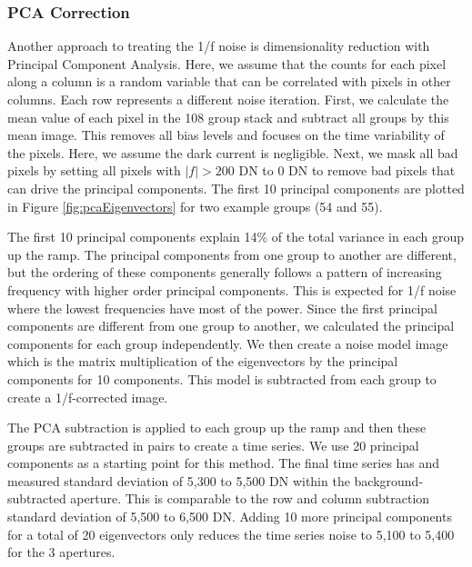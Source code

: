 \documentclass{aastex62}
\begin{document}
\subsubsection{PCA Correction}
Another approach to treating the 1/f noise is dimensionality reduction with Principal Component Analysis.
Here, we assume that the counts for each pixel along a column is a random variable that can be correlated with pixels in other columns.
Each row represents a different noise iteration.
First, we calculate the mean value of each pixel in the 108 group stack and subtract all groups by this mean image.
This removes all bias levels and focuses on the time variability of the pixels.
Here, we assume the dark current is negligible.
Next, we mask all bad pixels by setting all pixels with $| f | > 200$ DN to 0 DN to remove bad pixels that can drive the principal components.
The first 10 principal components are plotted in Figure \ref{fig:pcaEigenvectors} for two example groups (54 and 55).

The first 10 principal components explain 14\% of the total variance in each group up the ramp.
The principal components from one group to another are different, but the ordering of these components generally follows a pattern of increasing frequency with higher order principal components.
This is expected for 1/f noise where the lowest frequencies have most of the power.
Since the first principal components are different from one group to another, we calculated the principal components for each group independently.
We then create a noise model image which is the matrix multiplication of the eigenvectors by the principal components for 10 components.
This model is subtracted from each group to create a 1/f-corrected image.

The PCA subtraction is applied to each group up the ramp and then these groups are subtracted in pairs to create a time series.
We use 20 principal components as a starting point for this method.
The final time series has and measured standard deviation of 5,300 to 5,500 DN within the background-subtracted aperture.
This is comparable to the row and column subtraction standard deviation of 5,500 to 6,500 DN.
Adding 10 more principal components for a total of 20 eigenvectors only reduces the time series noise to 5,100 to 5,400 for the 3 apertures.
\end{document}
